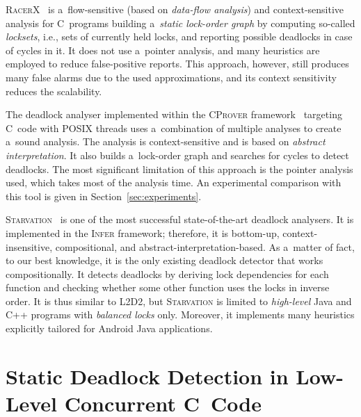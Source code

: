 \documentclass[runningheads]{llncs}
\newcommand{\LLDD}{\textsc{L2D2}\xspace} %
\newcommand{\Infer}{\textsc{Infer}\xspace}
\newcommand{\CProver}{\textsc{CProver}\xspace}
\begin{document}
\textsc{RacerX}~\cite{racerX03} is a~flow-sensitive (based on
\emph{data-flow analysis}) and context-sensitive analysis for C~programs
building a~\emph{static lock-order graph} by computing so-called
\emph{locksets}, i.e., sets of currently held locks, and reporting
possible deadlocks in case of cycles in it. It does not use a~pointer
analysis, and many heuristics are employed to reduce false-positive
reports. This approach, however, still produces many false alarms due to
the used approximations, and its context sensitivity reduces the scalability.

The deadlock analyser implemented within the \CProver
framework~\cite{kroening16} targeting C~code with POSIX threads uses
a~combination of multiple analyses to create a~sound analysis. The analysis
is context-sensitive and is based on \emph{abstract interpretation}. It also
builds a~lock-order graph and searches for cycles to detect deadlocks. The
most significant limitation of this approach is the pointer analysis used,
which takes most of the analysis time. An experimental comparison with this
tool is given in Section~\ref{sec:experiments}.

\textsc{Starvation}~\cite{deadlock-nikos21} is one of the most successful
state-of-the-art deadlock analysers. It is implemented in the \Infer framework;
therefore, it is bottom-up, context-insensitive, compositional, and
abstract-interpretation-based. As a~matter of fact, to our best knowledge,
it is the only existing deadlock detector that works compositionally. It
detects deadlocks by deriving lock dependencies for each function and
checking whether some other function uses the locks in inverse order. It is
thus similar to \LLDD, but \textsc{Starvation} is limited to
\emph{high-level} Java and C++ programs with \emph{balanced locks} only.
Moreover, it implements many heuristics explicitly tailored for Android Java
applications.

\enlargethispage{4mm}

\vspace*{-4mm}\section{Static Deadlock Detection in Low-Level Concurrent
C~Code}\vspace*{-2mm} \label{sec:l2d2}
\end{document}
